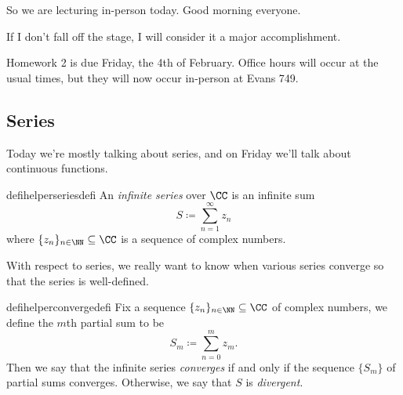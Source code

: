 
So we are lecturing in-person today. Good morning everyone.
\begin{quot}
	If I don't fall off the stage, I will consider it a major accomplishment.
\end{quot}
Homework 2 is due Friday, the 4th of February. Office hours will occur at the usual times, but they will now occur in-person at Evans 749.

\subsection{Series}
Today we're mostly talking about series, and on Friday we'll talk about continuous functions.
\begin{restatable}[Series]{defihelper}{seriesdefi} 
	An \textit{infinite series} over $\CC$ is an infinite sum
	\[S\coloneqq\sum_{n=1}^\infty z_n\]
	where $\{z_n\}_{n\in\NN}\subseteq\CC$ is a sequence of complex numbers.
\end{restatable}
\noindent With respect to series, we really want to know when various series converge so that the series is well-defined.
\begin{restatable}{defihelper}{convergedefi} 
	Fix a sequence $\{z_n\}_{n\in\NN}\subseteq\CC$ of complex numbers, we define the $m$th partial sum to be
	\[S_m\coloneqq\sum_{n=0}^mz_m.\]
	Then we say that the infinite series \textit{converges} if and only if the sequence $\{S_m\}$ of partial sums converges. Otherwise, we say that $S$ is \textit{divergent}.
\end{restatable}

